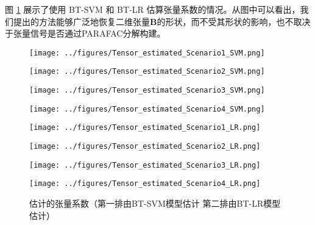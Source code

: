 \documentclass[AutoFakeBold]{LZUThesis}
\begin{document}
图 \ref{fig:all_scenarios} 展示了使用 BT-SVM 和 BT-LR 估算张量系数的情况。从图中可以看出，我们提出的方法能够广泛地恢复二维张量$\boldsymbol{B}$的形状，而不受其形状的影响，也不取决于张量信号是否通过PARAFAC分解构建。

\begin{figure}[h]
	\centering
	\begin{minipage}{0.24\textwidth}
		\centering
		\texttt{[image: ../figures/Tensor\_estimated\_Scenario1\_SVM.png]}
		\label{fig:scenario1_SVM}
	\end{minipage}
	\hfill
	\begin{minipage}{0.24\textwidth}
		\centering
		\texttt{[image: ../figures/Tensor\_estimated\_Scenario2\_SVM.png]}
		\label{fig:scenario2_SVM}
	\end{minipage}
	\hfill
	\begin{minipage}{0.24\textwidth}
		\centering
		\texttt{[image: ../figures/Tensor\_estimated\_Scenario3\_SVM.png]}
		\label{fig:scenario3_SVM}
	\end{minipage}
	\hfill
	\begin{minipage}{0.24\textwidth}
		\centering
		\texttt{[image: ../figures/Tensor\_estimated\_Scenario4\_SVM.png]}
		\label{fig:scenario4_SVM}
	\end{minipage}
	
	
	\begin{minipage}{0.24\textwidth}
		\centering
		\texttt{[image: ../figures/Tensor\_estimated\_Scenario1\_LR.png]}
		\label{fig:scenario1_LR}
	\end{minipage}
	\hfill
	\begin{minipage}{0.24\textwidth}
		\centering
		\texttt{[image: ../figures/Tensor\_estimated\_Scenario2\_LR.png]}
		\label{fig:scenario2_LR}
	\end{minipage}
	\hfill
	\begin{minipage}{0.24\textwidth}
		\centering
		\texttt{[image: ../figures/Tensor\_estimated\_Scenario3\_LR.png]}
		\label{fig:scenario3_LR}
	\end{minipage}
	\hfill
	\begin{minipage}{0.24\textwidth}
		\centering
		\texttt{[image: ../figures/Tensor\_estimated\_Scenario4\_LR.png]}
		\label{fig:scenario4_LR}
	\end{minipage}
	
	\caption{估计的张量系数（第一排由BT-SVM模型估计 第二排由BT-LR模型估计）}
	\label{fig:all_scenarios}
\end{figure}
\end{document}
